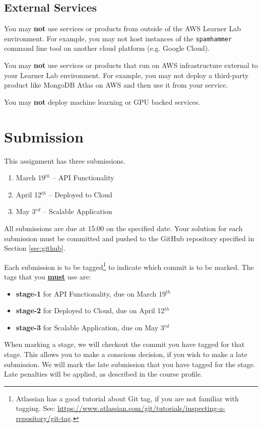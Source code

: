 \documentclass{csse4400}
\begin{document}
\subsection{External Services}
You may \textbf{not} use services or products from outside of the AWS Learner Lab environment.
For example, you may not host instances of the \texttt{spamhammer} command line tool on another cloud platform
(e.g. Google Cloud).

You may \textbf{not} use services or products that run on AWS infrastructure external to your Learner Lab environment.
For example, you may not deploy a third-party product like MongoDB Atlas on AWS and then use it from your service.

You may \textbf{not} deploy machine learning or GPU backed services.

\section{Submission}
This assignment has three submissions.

\begin{enumerate}
  \item March 19$^{th}$ -- API Functionality
  \item April 12$^{th}$ -- Deployed to Cloud
  \item May 3$^{rd}$ -- Scalable Application
\end{enumerate}
All submissions are due at 15:00 on the specified date.
Your solution for each submission must be committed and pushed to the GitHub repository specified in Section \ref{sec:github}.

Each submission is to be tagged\footnote{Atlassian has a good tutorial about Git tag, if you are not familiar with tagging. See: \url{https://www.atlassian.com/git/tutorials/inspecting-a-repository/git-tag}.}
to indicate which commit is to be marked.
The tags that you \textbf{\underline{must}} use are:
\begin{itemize}
  \item \textbf{stage-1} for API Functionality, due on March 19$^{th}$
  \item \textbf{stage-2} for Deployed to Cloud, due on April 12$^{th}$
  \item \textbf{stage-3} for Scalable Application, due on May 3$^{rd}$
\end{itemize}

When marking a stage, we will checkout the commit you have tagged for that stage.
This allows you to make a conscious decision, if you wish to make a late submission.
We will mark the late submission that you have tagged for the stage.
Late penalties will be applied, as described in the course profile.
\end{document}
